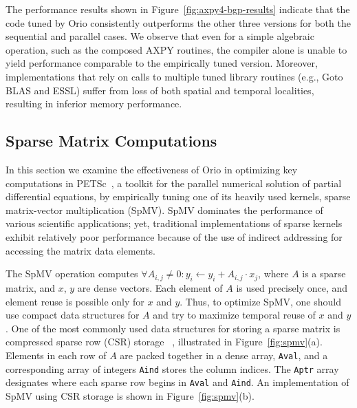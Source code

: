 The performance results shown in Figure~\ref{fig:axpy4-bgp-results} indicate
that the code tuned by Orio consistently outperforms the other three versions
for both the sequential and parallel cases. We observe that even for a simple
algebraic operation, such as the composed AXPY routines, the compiler alone
is unable to yield performance comparable to the empirically tuned
version. Moreover, implementations that rely on calls to multiple tuned
library routines (e.g., Goto BLAS and ESSL) suffer from loss of both spatial
and temporal localities, resulting in inferior memory performance.


\subsection{Sparse Matrix Computations} 

In this section we examine the effectiveness of Orio in optimizing key
computations in PETSc~\cite{petsc-user-ref}, a toolkit for the parallel
numerical solution of partial differential equations, by empirically tuning
one of its heavily used kernels, sparse matrix-vector multiplication
(SpMV). SpMV dominates the performance of various scientific applications;
yet, traditional implementations of sparse kernels exhibit relatively poor
performance because of the use of indirect addressing for accessing the
matrix data elements.

The SpMV operation computes $\forall{A_{i,j}} \neq 0:y_{i}
\leftarrow y_{i} + A_{i,j} \cdot x_{j}$, where $A$ is a sparse matrix,
and $x$, $y$ are dense vectors. Each element of $A$ is used precisely once,
and element reuse is possible only for $x$ and $y$. Thus, to optimize SpMV,
one should use compact data structures for $A$ and try to maximize temporal
reuse of $x$ and $y$. One of the most commonly used data structures for
storing a sparse matrix is compressed sparse row (CSR) storage
~\cite{vuduc-thesis},
illustrated in Figure~\ref{fig:spmv}(a). Elements in each row of $A$ are
packed together in a dense array, \texttt{Aval}, and a corresponding array of
integers \texttt{Aind} stores the column indices. The \texttt{Aptr} array
designates where each sparse row begins in \texttt{Aval} and
\texttt{Aind}. An implementation of SpMV using CSR storage is
shown in Figure~\ref{fig:spmv}(b).

